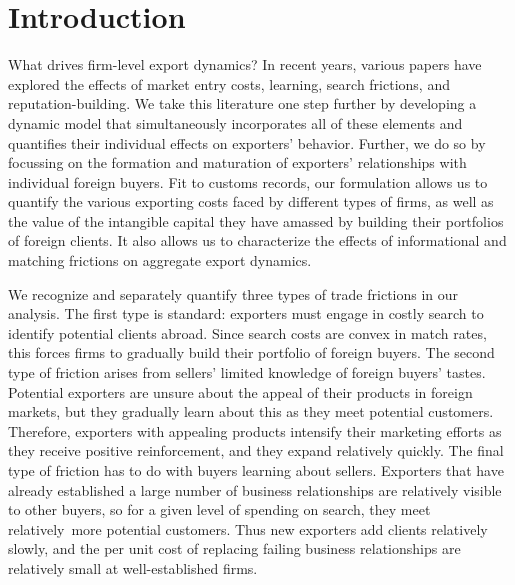 \documentclass[12pt]{article}
\begin{document}


\thispagestyle{empty}


\newpage

\section{Introduction}

What drives firm-level export dynamics? In recent years, various papers have explored the effects of market entry costs, learning, search frictions, and reputation-building. We take this literature one step further by developing a dynamic model that simultaneously incorporates all of these elements and quantifies their individual effects on exporters' behavior. Further, we do so by focussing on the formation and maturation of exporters' relationships with individual foreign buyers. Fit to customs records, our formulation allows us to quantify the various exporting costs faced by different types of firms, as well as the value of the intangible capital they have amassed by building their portfolios of foreign clients. It also allows us to characterize the effects of informational and matching frictions on aggregate export dynamics.

We recognize and separately quantify three types
of trade frictions in our analysis. The first type is standard: exporters must engage in
costly search to identify potential clients abroad. Since search costs are
convex in match rates, this forces firms to gradually build their portfolio
of foreign buyers. The second type of friction arises from sellers' limited
knowledge of foreign buyers' tastes. Potential exporters are unsure about
the appeal of their products in foreign markets, but they gradually learn
about this as they meet potential customers. Therefore, exporters with
appealing products intensify their marketing efforts as they receive
positive reinforcement, and they expand relatively quickly. The final type
of friction has to do with buyers learning about sellers. Exporters that
have already established a large number of business relationships are
relatively visible to other buyers, so for a given level of spending on
search, they meet relatively\ more potential customers. Thus new exporters
add clients relatively slowly, and the per unit cost of replacing failing
business relationships are relatively small at well-established firms.
\end{document}
